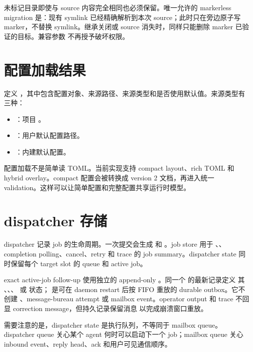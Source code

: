 未标记目录即使与 source 内容完全相同也必须保留。唯一允许的 markerless migration 是：现有 symlink 已经精确解析到本次 source；此时只在旁边原子写 marker，不替换 symlink。继承关闭或 source 消失时，同样只能删除 marker 已验证的目标。兼容参数  不再授予破坏权限。

\section{配置加载结果}

 定义 ，其中包含配置对象、来源路径、来源类型和是否使用默认值。来源类型有三种：

\begin{itemize}
  \item {}：项目 。
  \item {}：用户默认配置路径。
  \item {}：内建默认配置。
\end{itemize}

配置加载不是简单读 TOML。当前实现支持 compact layout、rich TOML 和 hybrid overlay。compact 配置会被转换成 version 2 文档，再进入统一 validation。这样可以让简单配置和完整配置共享运行时模型。

\section{dispatcher 存储}

dispatcher 记录 job 的生命周期。一次提交会生成  和 。job store 用于 、、completion polling、cancel、retry 和 trace 的 job summary。dispatcher state 同时保留每个 target slot 的 queue 和 active job。

exact active-job follow-up 使用独立的 append-only
。同一个  的最新记录定义
其 、、、 或
 状态； 是可在 daemon restart 后按 FIFO 重放的
durable outbox。它不创建 、message-bureau attempt 或 mailbox
event。operator output 和 trace 不回显 correction message，但持久记录保留消息
以完成崩溃窗口重放。

需要注意的是，dispatcher state 是执行队列，不等同于 mailbox queue。dispatcher queue 关心某个 agent 何时可以启动下一个 job；mailbox queue 关心 inbound event、reply head、ack 和用户可见通信顺序。

